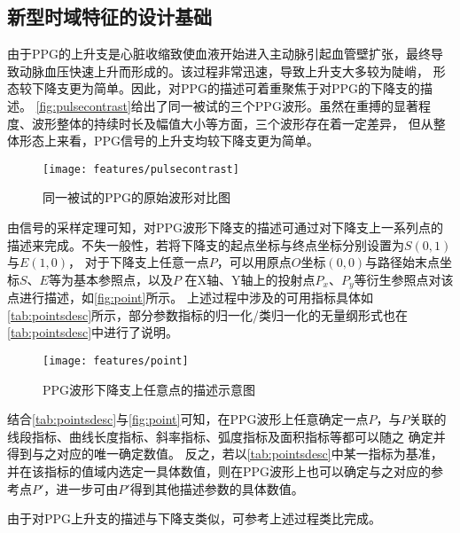\subsection{新型时域特征的设计基础}

由于PPG的上升支是心脏收缩致使血液开始进入主动脉引起血管壁扩张，最终导致动脉血压快速上升而形成的\cite{PPGYY}。该过程非常迅速，导致上升支大多较为陡峭，
形态较下降支更为简单\cite{PPGYY}。因此，对PPG的描述可着重聚焦于对PPG的下降支的描述。
\autoref{fig:pulsecontrast}给出了同一被试的三个PPG波形。虽然在重搏的显著程度、波形整体的持续时长及幅值大小等方面，三个波形存在着一定差异，
但从整体形态上来看，PPG信号的上升支均较下降支更为简单。

\begin{figure}[htbp]
    \centering
    \texttt{[image: features/pulsecontrast]}
    \caption{\label{fig:pulsecontrast}同一被试的PPG的原始波形对比图}
\end{figure}

由信号的采样定理可知，对PPG波形下降支的描述可通过对下降支上一系列点的描述来完成。不失一般性，若将下降支的起点坐标与终点坐标分别设置为$S$$(0,1)$与$E$$(1,0)$，
对于下降支上任意一点$P$，可以用原点$O$坐标$(0,0)$与路径始末点坐标$S$、$E$等为基本参照点，以及$P$
在X轴、Y轴上的投射点$P_x$、$P_y$等衍生参照点对该点进行描述，如\autoref{fig:point}所示。
上述过程中涉及的可用指标具体如\autoref{tab:pointsdesc}所示，部分参数指标的归一化/类归一化的无量纲形式也在\autoref{tab:pointsdesc}中进行了说明。

\begin{figure}[htbp]
    \centering
    \texttt{[image: features/point]}
    \caption{\label{fig:point}PPG波形下降支上任意点的描述示意图}
\end{figure}

结合\autoref{tab:pointsdesc}与\autoref{fig:point}可知，在PPG波形上任意确定一点$P$，与$P$关联的线段指标、曲线长度指标、斜率指标、弧度指标及面积指标等都可以随之
确定并得到与之对应的唯一确定数值。
反之，若以\autoref{tab:pointsdesc}中某一指标为基准，并在该指标的值域内选定一具体数值，则在PPG波形上也可以确定与之对应的参考点$P'$，进一步可由$P'$得到其他描述参数的具体数值。

由于对PPG上升支的描述与下降支类似，可参考上述过程类比完成。

